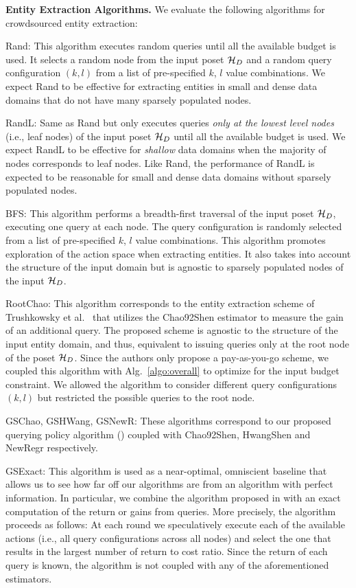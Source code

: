 \vspace{2pt}\noindent\textbf{Entity Extraction Algorithms.} We evaluate the following algorithms for crowdsourced entity extraction:
\squishlist
\item Rand: This algorithm executes random queries until all the available budget is used. It selects a random node from the input poset $\mathcal{H}_D$ and a random query configuration $(k,l)$ from a list of pre-specified $k$, $l$ value combinations. \iftr We expect Rand to be effective for extracting entities in small and dense data domains that do not have many sparsely populated nodes. \fi
\item RandL: Same as Rand but only executes queries {\em only at the lowest level nodes} (i.e., leaf nodes) of the input poset $\mathcal{H}_D$ until all the available budget is used.  \iftr We expect RandL to be effective for {\em shallow} data domains when the majority of nodes corresponds to leaf nodes. Like Rand, the performance of RandL is expected to be reasonable for small and dense data domains without sparsely populated nodes.\fi
\item BFS: This algorithm performs a breadth-first traversal of the input poset $\mathcal{H}_D$, executing one query at each node. The query configuration is randomly selected from a list of pre-specified $k$, $l$ value combinations. This algorithm promotes exploration of the action space when extracting entities. \iftr It also takes into account the structure of the input domain but is agnostic to sparsely populated nodes of the input $\mathcal{H}_D$. \fi
\item RootChao: This algorithm corresponds to the entity extraction scheme of Trushkowsky et al.~\cite{trushkowsky:2013} that utilizes the Chao92Shen estimator to measure the gain of an additional query. The proposed scheme is agnostic to the structure of the input entity domain, and thus, equivalent to issuing queries only at the root node of the poset $\mathcal{H}_D$. Since the authors only propose a pay-as-you-go scheme, we coupled this algorithm with Alg.~\ref{algo:overall} to optimize for the input budget constraint. We allowed the algorithm to consider different query configurations $(k,l)$ but restricted the possible queries to the root node.
\item GSChao, GSHWang, GSNewR: These algorithms correspond to our proposed querying policy algorithm () coupled with Chao92Shen, HwangShen and NewRegr respectively.
\item GSExact: This algorithm is used as a near-optimal, omniscient baseline that allows us to see how far off our algorithms are from an algorithm with perfect information. In particular, we combine the algorithm proposed in  with an exact computation of the return or gains from queries. More precisely, the algorithm proceeds as follows: At each round we speculatively execute each of the available actions (i.e., all query configurations across all nodes) and select the one that results in the largest number of return to cost ratio. Since the return of each query is known, the algorithm is not coupled with any of the aforementioned estimators.
\squishend

